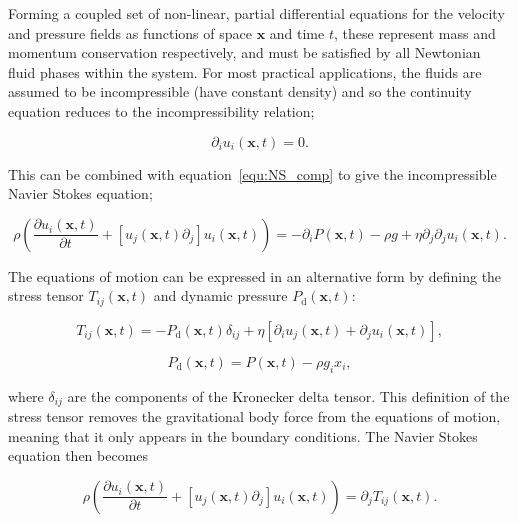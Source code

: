 \documentclass[12pt]{article}
\begin{document}
Forming a coupled set of non-linear, partial differential equations for the velocity and pressure fields as functions of space $\boldsymbol{x}$ and time $t$, these represent mass and momentum conservation respectively, and must be satisfied by all Newtonian fluid phases within the system. For most practical applications, the fluids are assumed to be incompressible (have constant density) and so the continuity equation reduces to the incompressibility relation;

\begin{equation}
\label{equ:incom}
\partial_{i} u_{i}(\boldsymbol{x},t) = 0 .
\end{equation}

This can be combined with equation~\ref{equ:NS_comp} to give the incompressible Navier Stokes equation;

\begin{equation}
\label{equ:NS_incom}
\rho \left( \frac{\partial u_{i}(\boldsymbol{x},t)}{\partial t} + [u_{j}(\boldsymbol{x},t) \partial_{j}] u_{i}(\boldsymbol{x},t) \right) = - \partial_{i} P(\boldsymbol{x},t) - \rho g + \eta \partial_{j} \partial_{j} u_{i}(\boldsymbol{x},t) .
\end{equation} 

The equations of motion can be expressed in an alternative form by defining the stress tensor $T_{ij}(\boldsymbol{x},t)$ \citep{Batchelor67, Manga94} and dynamic pressure $P_{\text{d}}(\boldsymbol{x},t)$:

\begin{equation}
\label{equ:stress}
T_{ij}(\boldsymbol{x},t) = -P_{\text{d}}(\boldsymbol{x},t)  \delta_{ij} + \eta[\partial_{i} u_{j}(\boldsymbol{x},t) + \partial_{j} u_{i}(\boldsymbol{x},t)], 
\end{equation}

\begin{equation}
\label{equ:dyn_P}
P_{\text{d}}(\boldsymbol{x},t) = P(\boldsymbol{x},t) - \rho g_{i} x_{i} ,
\end{equation}

where $\delta_{ij}$ are the components of the Kronecker delta tensor. This definition of the stress tensor removes the gravitational body force from the equations of motion, meaning that it only appears in the boundary conditions. The Navier Stokes equation then becomes

\begin{equation}
\label{equ:NS_stress}
\rho \left( \frac{\partial u_{i}(\boldsymbol{x},t)}{\partial t} + [u_{j}(\boldsymbol{x},t) \partial_{j}] u_{i}(\boldsymbol{x},t) \right) = \partial_{j} T_{ij}(\boldsymbol{x},t) .
\end{equation}
\end{document}
